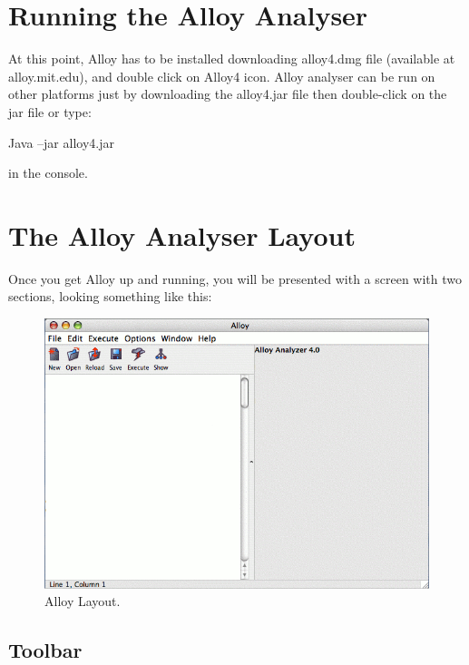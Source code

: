 \documentclass[a4paper,10pt]{report}
\begin{document}
\section{Running the Alloy Analyser}
\label{Run Alloy Analyzer}

At this point, Alloy has to be installed downloading alloy4.dmg file (available at alloy.mit.edu), and double click on Alloy4 icon. Alloy analyser can be run on other platforms just by downloading the alloy4.jar file then double-click on the jar file or type:

\begin{center}
Java –jar alloy4.jar
\end{center}

in the console.

\section{The Alloy Analyser Layout}
\label{Alloy Analyser layout}

Once you get Alloy up and running, you will be presented with a screen with two sections, looking something like this:

 \begin{figure}[h!]
\centering
 \includegraphics[width= 1\textwidth]{alloyblank.png}
\caption{Alloy Layout.}
 \end{figure}
 
\subsection{Toolbar}
\label{Tools}
\end{document}
